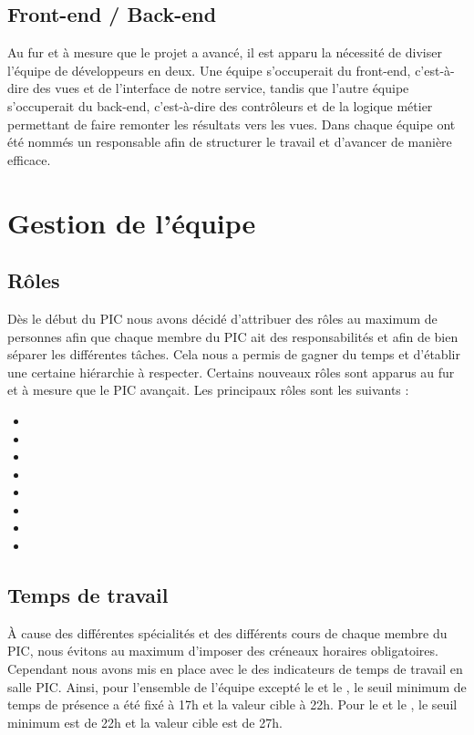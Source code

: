 \documentclass[asi]{picInsa}
\begin{document}
\subsection{Front-end / Back-end}
Au fur et à mesure que le projet a avancé, il est apparu la nécessité de diviser l'équipe de développeurs en deux. Une équipe s'occuperait du front-end, c'est-à-dire des vues et de l'interface de notre service, tandis que l'autre équipe s'occuperait du back-end, c'est-à-dire des contrôleurs et de la logique métier permettant de faire remonter les résultats vers les vues. Dans chaque équipe ont été nommés un responsable afin de structurer le travail et d'avancer de manière efficace.



\section{Gestion de l'équipe}
\subsection{Rôles}
Dès le début du PIC nous avons décidé d'attribuer des rôles au maximum de personnes afin que chaque membre du PIC ait des responsabilités et afin de bien séparer les différentes tâches. Cela nous a permis de gagner du temps et d’établir une certaine hiérarchie à respecter. Certains nouveaux rôles sont apparus au fur et à mesure que le PIC avançait. Les principaux rôles sont les suivants : 
\begin{itemize}
	\item \CP{}
	\item \CPA{}
	\item \RQ{}
	\item \RQA{}
	\item \RGC{}
	\item \RD{}
	\item \RRS{}
	\item \RS{}
\end{itemize}

\subsection{Temps de travail}
À cause des différentes spécialités et des différents cours de chaque membre du PIC, nous évitons au maximum d'imposer des créneaux horaires obligatoires. Cependant nous avons mis en place avec le \RQ{} des indicateurs de temps de travail en salle PIC. Ainsi, pour l'ensemble de l'équipe excepté le \CP{} et le \RQ{}, le seuil minimum de temps de présence a été fixé à 17h et la valeur cible à 22h. Pour le \CP{} et le \RQ{}, le seuil minimum est de 22h et la valeur cible est de 27h.
\end{document}

